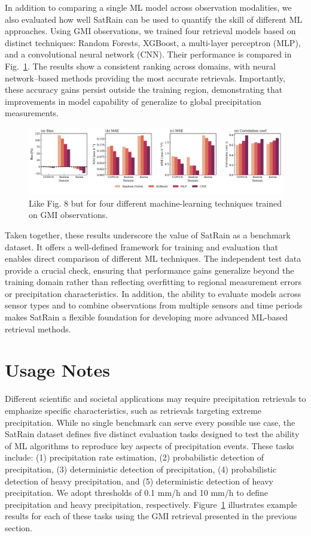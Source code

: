 \documentclass[11pt]{article}
\begin{document}
In addition to comparing a single ML model across observation modalities, we
also evaluated how well SatRain can be used to quantify the skill of different
ML approaches. Using GMI observations, we trained four retrieval models based on
distinct techniques: Random Forests, XGBoost, a multi-layer perceptron (MLP),
and a convolutional neural network (CNN). Their performance is compared in
Fig.~\ref{fig:sensor_comparison}. The results show a consistent ranking across
domains, with neural network–based methods providing the most accurate
retrievals. Importantly, these accuracy gains persist outside the training
region, demonstrating that improvements in model capability of generalize to
global precipitation measurements.

\begin{figure}[htbp]
	\centering
	\includegraphics[width=1.0\textwidth]{figures/fig11}
	\caption{
		Like Fig. 8 but for four different machine-learning techniques trained on GMI observations.
	}
	\label{fig:sensor_comparison}
\end{figure}

Taken together, these results underscore the value of SatRain as a benchmark
dataset. It offers a well-defined framework for training and evaluation that
enables direct comparison of different ML techniques. The independent test data
provide a crucial check, ensuring that performance gains generalize beyond the
training domain rather than reflecting overfitting to regional measurement
errors or precipitation characteristics. In addition, the ability to evaluate
models across sensor types and to combine observations from multiple sensors and
time periods makes SatRain a flexible foundation for developing more advanced
ML-based retrieval methods.

\section{Usage Notes}

Different scientific and societal applications may require precipitation
retrievals to emphasize specific characteristics, such as retrievals targeting
extreme precipitation. While no single benchmark can serve every possible use
case, the SatRain dataset defines five distinct evaluation tasks designed to
test the ability of ML algorithms to reproduce key aspects of precipitation
events. These tasks include: (1) precipitation rate estimation, (2)
probabilistic detection of precipitation, (3) deterministic detection of
precipitation, (4) probabilistic detection of heavy precipitation, and (5)
deterministic detection of heavy precipitation. We adopt thresholds of 0.1 mm/h
and 10 mm/h to define precipitation and heavy precipitation, respectively.
Figure~\ref{fig:sensor_comparison} illustrates example results for each of these
tasks using the GMI retrieval presented in the previous section.
\end{document}
